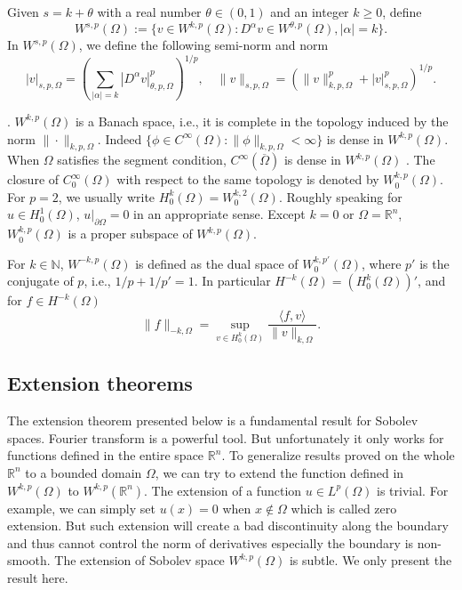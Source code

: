 Given $s = k + \theta$ with a real number $\theta\in(0, 1)$ and an integer $k\geq0$, define
\[
W^{s,p}(\Omega):=\{v\in W^{k,p}(\Omega): D^{\alpha}v\in W^{\theta,p}(\Omega), |\alpha|= k\}.
\]
In $W^{s,p}(\Omega)$, we define the following semi-norm and norm
\[
|v|_{s,p,\Omega}=\left(\sum_{|\alpha|=k}|D^{\alpha}v|_{\theta,p,\Omega}^p\right)^{1/p}, \quad \|v\|_{s,p,\Omega}=\left(\|v\|_{k,p,\Omega}^p+|v|_{s,p,\Omega}^p\right)^{1/p}.
\]


\vskip0.5cm.
$W^{k,p}(\Omega)$ is a Banach space, i.e., it is complete in the
topology induced by the norm $\|\cdot\|_{k,p,\Omega}$. Indeed
$\{\phi\in C^{\infty}(\Omega): \|\phi\|_{k,p,\Omega}<\infty\}$ is dense in
$W^{k,p}(\Omega)$. When $\Omega$ satisfies the segment condition, $C^{\infty}(\overline{\Omega})$ is dense in
$W^{k,p}(\Omega)$ \cite{AdamsFournier2003}.
 The closure of
$C_0^{\infty}(\Omega)$ with respect to the same topology is denoted
by $W_0^{k,p}(\Omega)$. For $p = 2$, we usually write $H_0^k(\Omega) = W_0^{k,2}(\Omega)$. Roughly speaking for $u\in H_0^1(\Omega)$, $u|_{\partial \Omega}=0$ in an appropriate sense. Except $k = 0$ or
$\Omega=\mathbb R^n$, $W_0^{k,p}(\Omega)$ is a
proper subspace of $W^{k,p}(\Omega)$.

For $k\in\mathbb N$, $W^{-k,p}(\Omega)$ is defined as the dual space of $W_0^{k,p'}(\Omega)$, where $p'$ is the conjugate
of $p$, i.e., $1/p + 1/p' = 1$. In particular $H^{-k}(\Omega) = (H_0^{k}(\Omega))'$, and for $f\in H^{-k}(\Omega)$
\[
\|f\|_{-k,\Omega}=\sup_{v\in H_0^k(\Omega)}\frac{\langle f, v\rangle}{\|v\|_{k,\Omega}}.
\]



\subsection{Extension theorems}
The extension theorem presented below is a fundamental result
for Sobolev spaces. Fourier transform is a powerful tool. But unfortunately it only works
for functions defined in the entire space $\mathbb R^n$. To generalize results proved on the whole $\mathbb R^n$ to a bounded domain $\Omega$, we can try to extend the function defined in $W^{k,p}(\Omega)$ to
$W^{k,p}(\mathbb R^n)$. The extension of a function $u\in L^p(\Omega)$ is trivial. For example, we can simply
set $u(x) = 0$ when $x\notin\Omega$ which is called zero extension. But such extension will create
a bad discontinuity along the boundary and thus cannot control the norm of derivatives
especially the boundary is non-smooth. The extension of Sobolev space $W^{k,p}(\Omega)$ is subtle.
We only present the result here.


